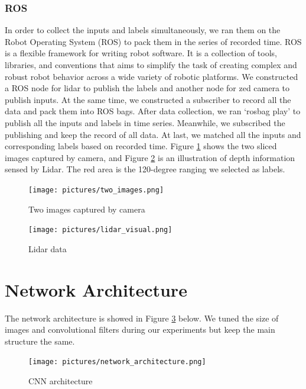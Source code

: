 \documentclass[10pt,twocolumn,letterpaper]{article}
\begin{document}
\subsubsection{ROS}
In order to collect the inputs and labels simultaneously, we ran them on the Robot Operating System (ROS) to pack them in the series of recorded time. ROS is a flexible framework for writing robot software. It is a collection of tools, libraries, and conventions that aims to simplify the task of creating complex and robust robot behavior across a wide variety of robotic platforms\cite{ROSabout}. We constructed a ROS node for lidar to publish the labels and another node for zed camera to publish inputs. At the same time, we constructed a subscriber to record all the data and pack them into ROS bags. After data collection, we ran ‘rosbag play’ to publish all the inputs and labels in time series. Meanwhile, we subscribed the publishing and keep the record of all data. At last, we matched all the inputs and corresponding labels based on recorded time.  Figure \ref{two_images} shows the two sliced images captured by camera, and Figure \ref{lidar_visual} is an illustration of depth information sensed by Lidar. The red area is the 120-degree ranging we selected as labels.
\begin{figure}[t]
\begin{center}
\texttt{[image: pictures/two\_images.png]}
\end{center}
   \caption{Two images captured by camera}
\label{two_images}
\end{figure}

\begin{figure}[t]
	\begin{center}
		\texttt{[image: pictures/lidar\_visual.png]}
	\end{center}
	\caption{Lidar data}
	\label{lidar_visual}
\end{figure}

\section{Network Architecture}
The network architecture is showed in Figure \ref{network} below. We tuned the size of images and convolutional filters during our experiments but keep the main structure the same.

\begin{figure}
\centering
   \texttt{[image: pictures/network\_architecture.png]}
   \caption{CNN architecture}
\label{network}
\end{figure}
\end{document}
